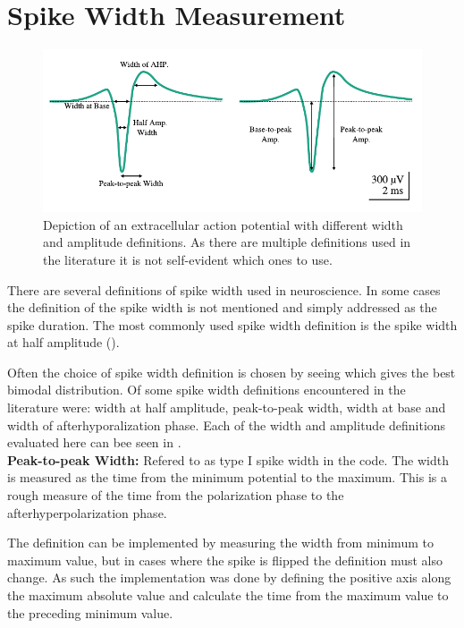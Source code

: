 \documentclass[altfont, fleqn]{uiophd}
\renewcommand{\cref}[1]{{\color{viridis_03}\mycref{#1}}}
\begin{document}
\vspace{1em} 
\startcontents
{}
\section{Spike Width Measurement}
\begin{figure}[h]
    \centering
    \includegraphics[width=1.0\textwidth]{images/sec_3/ap_eap.pdf}
    \caption{Depiction of an extracellular action potential with
    different width and amplitude definitions. 
    As there are multiple definitions used in the literature
    it is not self-evident which ones to use. 
    }
    \label{fig:3_ap_eap}
\end{figure}
There
are several definitions of spike width used in neuroscience. 
In some cases the definition of the spike width is not mentioned
and simply addressed as the spike duration. 
The most commonly used spike width definition is the spike width at half 
amplitude
(\textcite{bean_action_2007}).

Often the choice of spike width definition is chosen by
seeing which gives the best bimodal distribution. 
Of some spike width definitions encountered in the literature 
were:
width at half amplitude, 
peak-to-peak width, 
width at base
and 
width of afterhyporalization phase. 
Each of the width and amplitude definitions evaluated here
can bee seen in \cref{fig:3_ap_eap}.
\\

\noindent 
{\bf Peak-to-peak Width:} 
Refered to as type I spike width in the code. 
The width is measured as the time from the minimum potential to the maximum. 
This is a rough measure of the time from the polarization phase to 
the afterhyperpolarization phase. 

The definition can be implemented by measuring the width from
minimum to maximum value, but in cases where the spike is flipped
the definition must also change. 
As such the implementation was done by defining the positive axis along 
the maximum absolute value and calculate the time from 
the maximum value to the preceding minimum value.
\newline
\end{document}
